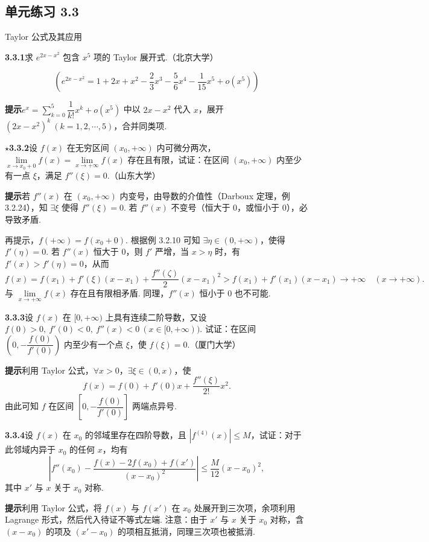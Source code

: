 \documentclass[UTF8,12pt,a4paper,fontset=fandol]{ctexart}
\begin{document}
\subsection*{单元练习 3.3}

\noindent Taylor 公式及其应用

\noindent\textbf{3.3.1}\quad 求 $e^{2x-x^2}$ 包含 $x^5$ 项的 Taylor 展开式.（北京大学）

\[
  \left(e^{2x-x^2}=1+2x+x^2-\frac23x^3-\frac56x^4-\frac1{15}x^5+o(x^5)\right)
\]

\noindent\textbf{提示}\quad $e^x=\sum\limits_{k=0}^5\dfrac1{k!}x^k+o(x^5)$ 中以 $2x-x^2$ 代入 $x$，展开 $(2x-x^2)^k\ (k=1,2,\cdots,5)$，合并同类项.

\noindent\textbf{$\star$3.3.2}\quad 设 $f(x)$ 在无穷区间 $(x_0,+\infty)$ 内可微分两次，$\lim\limits_{x\to x_0+0}f(x)=\lim\limits_{x\to+\infty}f(x)$ 存在且有限，试证：在区间 $(x_0,+\infty)$ 内至少有一点 $\xi$，满足 $f''(\xi)=0$.（山东大学）

\noindent\textbf{提示}\quad 若 $f''(x)$ 在 $(x_0,+\infty)$ 内变号，由导数的介值性（Darboux 定理，例 3.2.24），知 $\exists\xi$ 使得 $f''(\xi)=0$. 若 $f''(x)$ 不变号（恒大于 0，或恒小于 0），必导致矛盾.

再提示，$f(+\infty)=f(x_0+0)$. 根据例 3.2.10 可知 $\exists\eta\in(0,+\infty)$，使得 $f'(\eta)=0$. 若 $f''(x)$ 恒大于 0，则 $f'$ 严增，当 $x>\eta$ 时，有 $f'(x)>f'(\eta)=0$，从而
\[
  f(x)=f(x_1)+f'(\xi)(x-x_1)+\frac{f''(\zeta)}2(x-x_1)^2>f(x_1)+f'(x_1)(x-x_1)\to+\infty\quad(x\to+\infty).
\]
与 $\lim\limits_{x\to+\infty}f(x)$ 存在且有限相矛盾. 同理，$f''(x)$ 恒小于 0 也不可能.

\noindent\textbf{3.3.3}\quad 设 $f(x)$ 在 $[0,+\infty)$ 上具有连续二阶导数，又设 $f(0)>0,\ f'(0)<0,\ f''(x)<0\ (x\in[0,+\infty))$. 试证：在区间 $\left(0,-\dfrac{f(0)}{f'(0)}\right)$ 内至少有一个点 $\xi$，使 $f(\xi)=0$.（厦门大学）

\noindent\textbf{提示}\quad 利用 Taylor 公式，$\forall x>0$，$\exists\xi\in(0,x)$，使
\[
  f(x)=f(0)+f'(0)x+\frac{f''(\xi)}{2!}x^2.
\]
由此可知 $f$ 在区间 $\left[0,-\dfrac{f(0)}{f'(0)}\right]$ 两端点异号.

\noindent\textbf{3.3.4}\quad 设 $f(x)$ 在 $x_0$ 的邻域里存在四阶导数，且 $|f^{(4)}(x)|\le M$，试证：对于此邻域内异于 $x_0$ 的任何 $x$，均有
\[
  \left|f''(x_0)-\frac{f(x)-2f(x_0)+f(x')}{(x-x_0)^2}\right|
  \le \frac{M}{12}(x-x_0)^2,
\]
其中 $x'$ 与 $x$ 关于 $x_0$ 对称.

\noindent\textbf{提示}\quad 利用 Taylor 公式，将 $f(x)$ 与 $f(x')$ 在 $x_0$ 处展开到三次项，余项利用 Lagrange 形式，然后代入待证不等式左端. 注意：由于 $x'$ 与 $x$ 关于 $x_0$ 对称，含 $(x-x_0)$ 的项及 $(x'-x_0)$ 的项相互抵消，同理三次项也被抵消.
\end{document}

